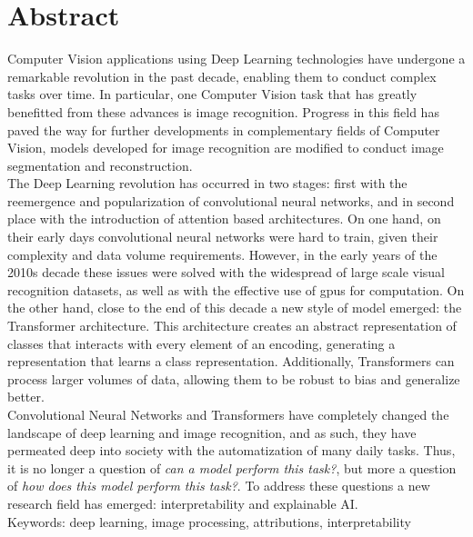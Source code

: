 \chapter*{Abstract}
Computer Vision applications using Deep Learning technologies have undergone a remarkable 
revolution in the past decade, enabling them to conduct complex tasks over time. In particular, one 
Computer Vision task that has greatly benefitted from these advances is image recognition. 
Progress in this field has paved the way for further developments in complementary fields of 
Computer Vision, models developed for image recognition are modified to conduct image segmentation 
and reconstruction.\\

\noindent The Deep Learning revolution has occurred in two stages: first with the reemergence and 
popularization of convolutional neural networks, and in second place with the 
introduction of attention based architectures. On one hand, on their early days convolutional 
neural networks were hard to train, given their complexity and data volume requirements. 
However, in the early years of the 2010s decade these issues were solved with the widespread of 
large scale visual recognition datasets, as well as with the effective use of \glspl{gpu} for 
computation. On the other hand, close to the end of this decade a new style of model emerged: 
the Transformer architecture. This architecture creates an abstract representation of classes 
that interacts with every element of an encoding, generating a representation that learns a 
class representation. Additionally, Transformers can process larger volumes of data, 
allowing them to be robust to bias and generalize better.\\

\noindent Convolutional Neural Networks and Transformers have completely changed the landscape of 
deep learning and image recognition, and as such, they have permeated deep into society with the 
automatization of many daily tasks. Thus, it is no longer a question of \emph{can a model perform 
this task?}, but more a question of \emph{how does this model perform this task?}. To address these 
questions a new research field has emerged: interpretability and explainable AI.\\

\vspace{0.5cm}
Keywords: deep learning, image processing, attributions, interpretability

